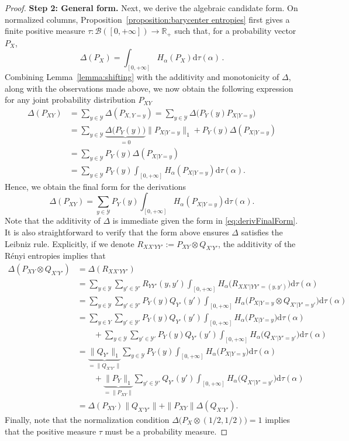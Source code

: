 \documentclass[aps,pra,11pt,onecolumn,nofootinbib,tightenlines]{revtex4-2}
\theoremstyle{definition}
\def \d {\mathrm{d}}
\newcommand{\Y}{\mathcal{Y}}
\newcommand{\R}{\mathbb{R}}
\begin{document}
\begin{proof}
\medskip
\noindent \noindent\textbf{Step 2: General form.}
Next, we derive the algebraic candidate form. On normalized columns,
Proposition~\ref{proposition:barycenter entropies} first gives a finite positive
measure $\tau \colon \mathcal{B}([0,+\infty])\to\R_+$ such that, for a
probability vector $P_X$,
\begin{equation}
\Delta(P_X)=\int_{[0,+\infty]}H_\alpha(P_X)\d\tau(\alpha)\,.
\end{equation}
Combining Lemma~\ref{lemma:shifting} with the additivity and monotonicity of $\Delta$, along with the observations made above, we now obtain the following expression for any joint probability distribution $P_{XY}$
\begin{align}
\Delta(P_{XY})&=\sum_{y\in \Y}\Delta(P_{X,Y=y})=\sum_{y\in \Y}\Delta\big(P_Y(y)P_{X|Y=y}\big)\\
&=\sum_{y\in \Y}\underbrace{\Delta\big(P_Y(y)\big)}_{=0}\|P_{X|Y=y}\|_1+P_Y(y)\Delta(P_{X|Y=y})\\
&=\sum_{y\in \Y}P_Y(y)\Delta(P_{X|Y=y})\\
&=\sum_{y\in \Y}P_Y(y)\int_{[0,+\infty]}H_\alpha(P_{X|Y=y})\d\tau(\alpha).
\end{align}
Hence, we obtain the final form for the derivations
\begin{equation}
\label{eq:derivFinalForm}
    \Delta(P_{XY}) = \sum_{y\in \Y}P_Y(y)\int_{[0,+\infty]}H_\alpha(P_{X|Y=y})\d\tau(\alpha).
\end{equation}
Note that the additivity of $\Delta$ is immediate given the form in \eqref{eq:derivFinalForm}. It is also straightforward to verify that the form above ensures $\Delta$ satisfies the Leibniz rule. Explicitly, if we denote $R_{XX'YY'}:=P_{XY}\otimes Q_{X'Y'}$, the additivity
of the R\'{e}nyi entropies implies that
\begin{align}
\Delta(P_{XY}\otimes Q_{X'Y'})&=\Delta(R_{XX'YY'})\\
&=\sum_{y\in \Y}\sum_{y'\in \Y'}R_{YY'}(y,y')\int_{[0,+\infty]}H_\alpha\big(R_{XX'|YY'=(y,y')}\big)\d\tau(\alpha)\\
&=\sum_{y\in \Y}\sum_{y'\in \Y'}P_Y(y)Q_{Y'}(y')\int_{[0,+\infty]}H_\alpha\big(P_{X|Y=y}\otimes Q_{X'|Y'=y'}\big)\d\tau(\alpha)\\
&=\sum_{y\in Y}\sum_{y'\in \Y'}P_Y(y)Q_{Y'}(y')\int_{[0,+\infty]}H_\alpha\big(P_{X|Y=y}\big)\d\tau(\alpha)\\
&\qquad +\sum_{y\in \Y}\sum_{y'\in \Y'}P_Y(y)Q_{Y'}(y')\int_{[0,+\infty]}H_\alpha\big(Q_{X'|Y'=y'}\big)\d\tau(\alpha)\\
&=\underbrace{\|Q_{Y'}\|_1}_{=\|Q_{X'Y'}\|}\sum_{y\in \Y}P_Y(y)\int_{[0,+\infty]}H_\alpha\big(P_{X|Y=y}\big)\d\tau(\alpha)\\
&\qquad +\underbrace{\|P_Y\|_1}_{=\|P_{XY}\|}\sum_{y'\in \Y'}Q_{Y'}(y')\int_{[0,+\infty]}H_\alpha\big(Q_{X'|Y'=y'}\big)\d\tau(\alpha)\\
&=\Delta(P_{XY})\|Q_{X'Y'}\|+\|P_{XY}\|\Delta(Q_{X'Y'}).
\end{align}
Finally, note that the normalization condition $\Delta\big(P_X\otimes(1/2,1/2)\big)=1$ implies that the positive measure $\tau$ must be a probability measure.



\end{proof}
\end{document}
